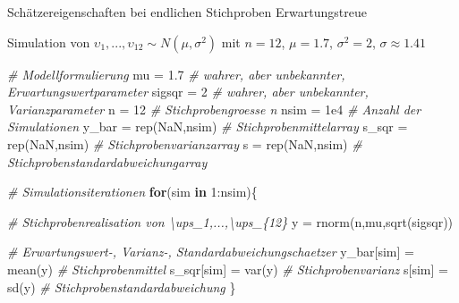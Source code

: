 \documentclass[
  8pt,
  ignorenonframetext,
]{beamer}
\newenvironment{Shaded}{\begin{snugshade}}{\end{snugshade}}
\newcommand{\CommentTok}[1]{\textcolor[rgb]{0.56,0.35,0.01}{\textit{#1}}}
\newcommand{\ConstantTok}[1]{\textcolor[rgb]{0.00,0.00,0.00}{#1}}
\newcommand{\ControlFlowTok}[1]{\textcolor[rgb]{0.13,0.29,0.53}{\textbf{#1}}}
\newcommand{\DecValTok}[1]{\textcolor[rgb]{0.00,0.00,0.81}{#1}}
\newcommand{\FloatTok}[1]{\textcolor[rgb]{0.00,0.00,0.81}{#1}}
\newcommand{\FunctionTok}[1]{\textcolor[rgb]{0.00,0.00,0.00}{#1}}
\newcommand{\NormalTok}[1]{#1}
\newcommand{\OtherTok}[1]{\textcolor[rgb]{0.56,0.35,0.01}{#1}}
\newcommand{\SpecialCharTok}[1]{\textcolor[rgb]{0.00,0.00,0.00}{#1}}
\newcommand{\ups} {\upsilon}
\begin{document}
\begin{frame}[fragile]{\small Schätzereigenschaften bei endlichen
Stichproben \textbar{} Erwartungstreue}
\protect\hypertarget{schuxe4tzereigenschaften-bei-endlichen-stichproben-erwartungstreue-6}{}
\small

Simulation von \(\ups_1,...,\ups_{12} \sim N(\mu,\sigma^2)\) mit
\(n = 12\), \(\mu = 1.7\), \(\sigma^2 = 2\), \(\sigma \approx 1.41\)
\vspace{1mm}

\footnotesize

\begin{Shaded}
\begin{Highlighting}[]
\CommentTok{\# Modellformulierung}
\NormalTok{mu      }\OtherTok{=} \FloatTok{1.7}                        \CommentTok{\# wahrer, aber unbekannter, Erwartungswertparameter}
\NormalTok{sigsqr  }\OtherTok{=} \DecValTok{2}                          \CommentTok{\# wahrer, aber unbekannter, Varianzparameter}
\NormalTok{n       }\OtherTok{=} \DecValTok{12}                         \CommentTok{\# Stichprobengroesse n}
\NormalTok{nsim    }\OtherTok{=} \FloatTok{1e4}                        \CommentTok{\# Anzahl der Simulationen}
\NormalTok{y\_bar   }\OtherTok{=} \FunctionTok{rep}\NormalTok{(}\ConstantTok{NaN}\NormalTok{,nsim)              }\CommentTok{\# Stichprobenmittelarray}
\NormalTok{s\_sqr   }\OtherTok{=} \FunctionTok{rep}\NormalTok{(}\ConstantTok{NaN}\NormalTok{,nsim)              }\CommentTok{\# Stichprobenvarianzarray}
\NormalTok{s       }\OtherTok{=} \FunctionTok{rep}\NormalTok{(}\ConstantTok{NaN}\NormalTok{,nsim)              }\CommentTok{\# Stichprobenstandardabweichungarray}

\CommentTok{\# Simulationsiterationen}
\ControlFlowTok{for}\NormalTok{(sim }\ControlFlowTok{in} \DecValTok{1}\SpecialCharTok{:}\NormalTok{nsim)\{}

    \CommentTok{\# Stichprobenrealisation von \textbackslash{}ups\_1,...,\textbackslash{}ups\_\{12\}}
\NormalTok{    y          }\OtherTok{=} \FunctionTok{rnorm}\NormalTok{(n,mu,}\FunctionTok{sqrt}\NormalTok{(sigsqr))}

    \CommentTok{\# Erwartungswert{-}, Varianz{-}, Standardabweichungschaetzer}
\NormalTok{    y\_bar[sim] }\OtherTok{=} \FunctionTok{mean}\NormalTok{(y)             }\CommentTok{\# Stichprobenmittel}
\NormalTok{    s\_sqr[sim] }\OtherTok{=} \FunctionTok{var}\NormalTok{(y)              }\CommentTok{\# Stichprobenvarianz}
\NormalTok{    s[sim]     }\OtherTok{=} \FunctionTok{sd}\NormalTok{(y)               }\CommentTok{\# Stichprobenstandardabweichung}
\NormalTok{\}}


\end{Highlighting}
\end{Shaded}
\end{frame}
\end{document}

